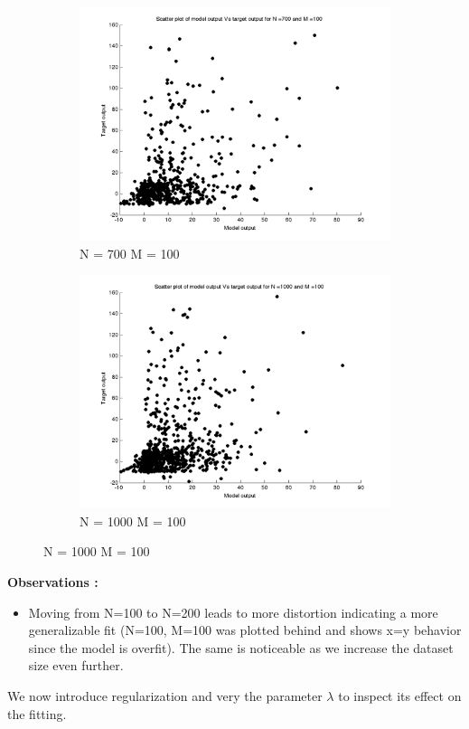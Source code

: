\documentclass{article}
\begin{document}
\begin{figure}[H]
\begin{subfigure}{.5\textwidth}
\centering
\includegraphics[width=\linewidth]{D2/Scatter/VaryingN_N700M100}
\caption{N = 700 M = 100}
\end{subfigure}
\begin{subfigure}{.5\textwidth}
\includegraphics[width=\linewidth]{D2/Scatter/VaryingN_N1000M100}
\caption{N = 1000 M = 100}
\end{subfigure}



\end{figure}


\textbf{Observations :}

\begin{itemize}
\item Moving from N=100 to N=200 leads to more distortion indicating a more generalizable fit (N=100, M=100 was plotted behind and shows x=y behavior since the model is overfit). The same is noticeable as we increase the dataset size even further.
\end{itemize}
\newpage
We now introduce regularization and very the parameter $\lambda$ to inspect its effect on the fitting.
\end{document}
